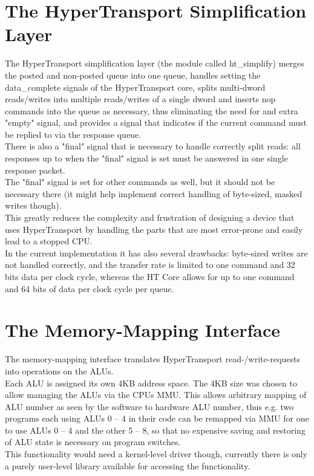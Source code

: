 \section{The HyperTransport Simplification Layer}
\label{sec:htsimplify}

The HyperTransport simplification layer (the module called ht\_simplify)
merges the posted and non-posted queue into one queue, handles setting
the data\_complete signals of the HyperTransport core, splits multi-dword
reads/writes into multiple reads/writes of a single dword and inserts nop
commands into the queue as necessary, thus eliminating the need for
and extra "empty" signal, and provides a signal that indicates
if the current command must be replied to via the response queue.\\
There is also a "final" signal that is necessary to handle correctly
split reads: all responses up to when the "final" signal is set
must be answered in one single response packet.\\
The "final" signal is set for other commands as well, but it should
not be necessary there (it might help implement correct handling
of byte-sized, masked writes though).\\
This greatly reduces the complexity and frustration of designing a device
that uses HyperTransport by handling the parts that are most error-prone
and easily lead to a stopped CPU.\\
In the current implementation it has also several drawbacks: byte-sized
writes are not handled correctly, and the transfer rate is limited to one command
and 32 bits data per clock cycle, whereas the HT Core allows for up to one
command and 64 bits of data per clock cycle per queue.\\

\section{The Memory-Mapping Interface}

The memory-mapping interface translates HyperTransport read-/write-requests into
operations on the ALUs.\\
Each ALU is assigned its own 4KB address space. The 4KB size was chosen to allow
managing the ALUs via the CPUs MMU.
This allows arbitrary mapping of ALU number as seen by the software to hardware
ALU number, thus e.g. two programs each using ALUs 0 -- 4 in their code can be remapped
via MMU for one to use ALUs 0 -- 4 and the other 5 -- 8, so that no expensive saving and
restoring of ALU state is necessary on program switches.\\
This functionality would need a kernel-level driver though, currently there is only
a purely user-level library available for accessing the functionality.\\

